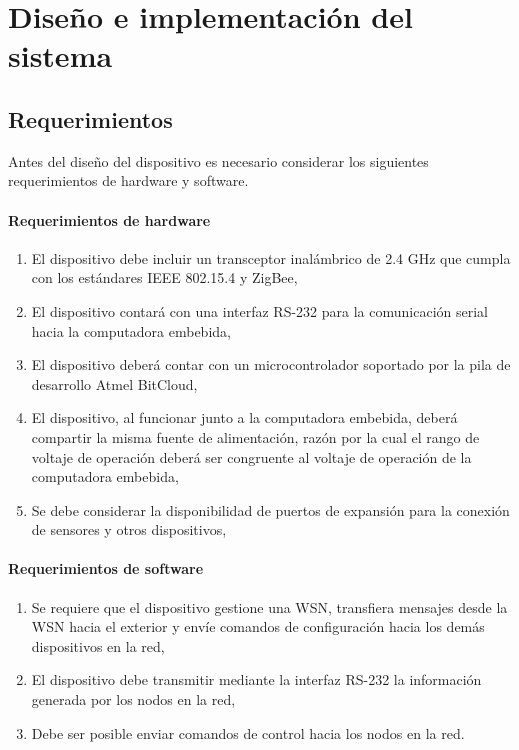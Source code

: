 \chapter{Diseño e implementaci\'on del sistema}

\section{Requerimientos}

Antes del diseño del dispositivo es necesario considerar los siguientes requerimientos de hardware y software.

\subsubsection{Requerimientos de hardware}

\begin{enumerate}
	\item El dispositivo debe incluir un transceptor inalámbrico de 2.4 GHz que cumpla con los estándares IEEE 802.15.4 y ZigBee, 
	\item El dispositivo contará con una interfaz RS-232 para la comunicación serial hacia la computadora embebida, 
	\item El dispositivo deberá contar con un microcontrolador soportado por la pila de desarrollo Atmel BitCloud,
	\item El dispositivo, al funcionar junto a la computadora embebida, deberá compartir la misma fuente de alimentación, razón por la cual el rango de voltaje de operación deberá ser congruente al voltaje de operación de la computadora embebida, 
	\item Se debe considerar la disponibilidad de puertos de expansión para la conexión de sensores y otros dispositivos, 
\end{enumerate}

\subsubsection{Requerimientos de software}

\begin{enumerate}
	\item Se requiere que el dispositivo gestione una WSN, transfiera mensajes desde la WSN hacia el exterior y env\'ie comandos de configuraci\'on hacia los dem\'as dispositivos en la red, 
	\item El dispositivo debe transmitir mediante la interfaz RS-232 la información generada por los nodos en la red, 
	\item Debe ser posible enviar comandos de control hacia los nodos en la red.
\end{enumerate}

